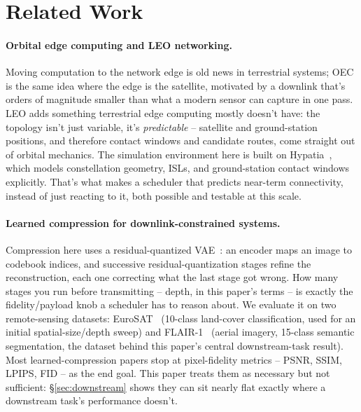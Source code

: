 \section{Related Work}
\label{sec:related-work}


\paragraph{Orbital edge computing and LEO networking.} Moving computation to the network edge is old news in terrestrial systems; OEC is the same idea where the edge is the satellite, motivated by a downlink that's orders of magnitude smaller than what a modern sensor can capture in one pass. LEO adds something terrestrial edge computing mostly doesn't have: the topology isn't just variable, it's \emph{predictable} -- satellite and ground-station positions, and therefore contact windows and candidate routes, come straight out of orbital mechanics. The simulation environment here is built on Hypatia~\cite{kassing2020hypatia}, which models constellation geometry, ISLs, and ground-station contact windows explicitly. That's what makes a scheduler that predicts near-term connectivity, instead of just reacting to it, both possible and testable at this scale.

\paragraph{Learned compression for downlink-constrained systems.} Compression here uses a residual-quantized VAE~\cite{lee2022autoregressive}: an encoder maps an image to codebook indices, and successive residual-quantization stages refine the reconstruction, each one correcting what the last stage got wrong. How many stages you run before transmitting -- depth, in this paper's terms -- is exactly the fidelity/payload knob a scheduler has to reason about. We evaluate it on two remote-sensing datasets: EuroSAT~\cite{helber2019eurosat} (10-class land-cover classification, used for an initial spatial-size/depth sweep) and FLAIR-1~\cite{garioud2022flair} (aerial imagery, 15-class semantic segmentation, the dataset behind this paper's central downstream-task result). Most learned-compression papers stop at pixel-fidelity metrics -- PSNR, SSIM, LPIPS, FID -- as the end goal. This paper treats them as necessary but not sufficient: \S\ref{sec:downstream} shows they can sit nearly flat exactly where a downstream task's performance doesn't.

